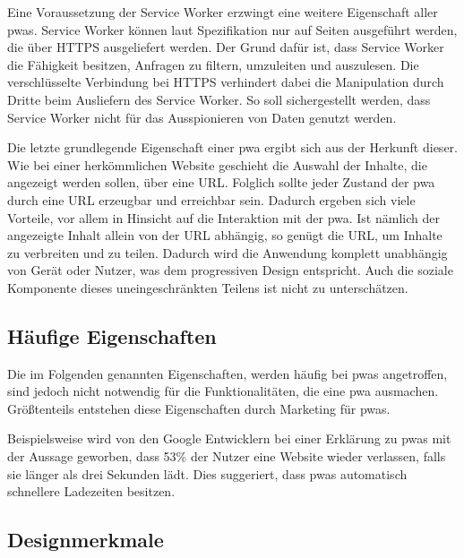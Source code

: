 \documentclass[12pt, parskip=half]{scrartcl}       %
\begin{document}
Eine Voraussetzung der Service Worker erzwingt eine weitere Eigenschaft aller \acp{pwa}.
Service Worker können laut Spezifikation nur auf Seiten ausgeführt werden, die über HTTPS ausgeliefert werden.
Der Grund dafür ist, dass Service Worker die Fähigkeit besitzen, Anfragen zu filtern, umzuleiten und auszulesen.
Die verschlüsselte Verbindung bei HTTPS verhindert dabei die Manipulation durch Dritte beim Ausliefern des Service Worker.
So soll sichergestellt werden, dass Service Worker nicht für das Ausspionieren von Daten genutzt werden\cite{ServiceWorker_explained}.

Die letzte grundlegende Eigenschaft einer \ac{pwa} ergibt sich aus der Herkunft dieser.
Wie bei einer herkömmlichen Website geschieht die Auswahl der Inhalte, die angezeigt werden sollen, über eine URL.
Folglich sollte jeder Zustand der \ac{pwa} durch eine URL erzeugbar und erreichbar sein.
Dadurch ergeben sich viele Vorteile, vor allem in Hinsicht auf die Interaktion mit der \ac{pwa}.
Ist nämlich der angezeigte Inhalt allein von der URL abhängig, so genügt die URL, um Inhalte zu verbreiten und zu teilen.
Dadurch wird die Anwendung komplett unabhängig von Gerät oder Nutzer, was dem progressiven Design entspricht.
Auch die soziale Komponente dieses uneingeschränkten Teilens ist nicht zu unterschätzen.


\subsection{Häufige Eigenschaften}

Die im Folgenden genannten Eigenschaften, werden häufig bei \acp{pwa} angetroffen, sind jedoch nicht notwendig für die Funktionalitäten, die eine \ac{pwa} ausmachen.
Größtenteils entstehen diese Eigenschaften durch Marketing für \acp{pwa}.

Beispielsweise wird von den Google Entwicklern bei einer Erklärung zu \acp{pwa} mit der Aussage geworben, dass 53\% der Nutzer eine Website wieder verlassen, falls sie länger als drei Sekunden lädt\cite{googledevs_performance}.
Dies suggeriert, dass \acp{pwa} automatisch schnellere Ladezeiten besitzen.


\subsection{Designmerkmale}
\end{document}
